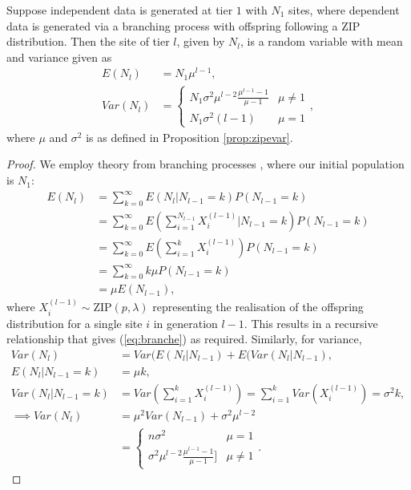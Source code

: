 \begin{proposition}
\label{prop:zipgeneration}
    Suppose independent data is generated at tier $1$ with $N_1$ sites, where dependent data is generated via a branching process with offspring following a ZIP distribution. Then the site of tier $l$, given by $N_l$, is a random variable with mean and variance given as 
    \begin{align}
        E(N_l) &= N_1 \mu^{l-1}, \label{eq:branche}\\
        Var(N_l) &= \begin{cases}
            N_1 \sigma^2 \mu^{l-2} \frac{\mu^{l-1}-1}{\mu-1} & \mu \neq 1\\
            N_1 \sigma^2 (l-1) & \mu = 1
        \end{cases} \label{eq:branchvar},
    \end{align}
    where $\mu$ and $\sigma^2$ is as defined in Proposition \ref{prop:zipevar}.
\end{proposition}
\begin{proof}
    We employ theory from branching processes \cite{Dubrow2016}, where our initial population is $N_1$:
    \begin{align}
        E(N_l) &= \sum_{k=0}^\infty E(N_l|N_{l-1} = k) P(N_{l-1}=k) \\
        &= \sum_{k=0}^\infty E\left(\sum_{i=1}^{N_{l-1}} X^{(l-1)}_{i} | N_{l-1} = k\right) P(N_{l-1}=k) \\
        &= \sum_{k=0}^\infty E\left(\sum_{i=1}^{k} X^{(l-1)}_{i}\right) P(N_{l-1}=k) \\
        &= \sum_{k=0}^\infty k\mu P(N_{l-1}=k) \\
        &= \mu E(N_{l-1}),
    \end{align}
    where $X^{(l-1)}_{i} \sim \text{ZIP}(p, \lambda)$ representing the realisation of the offspring distribution for a single site $i$ in generation $l-1$. This results in a recursive relationship that gives (\ref{eq:branche}) as required. Similarly, for variance,
    \begin{align}
        Var(N_l) &= Var(E(N_l | N_{l-1}) + E(Var(N_l|N_{l-1}), \\
        E(N_l|N_{l-1} = k) &= \mu k, \\
        Var(N_l|N_{l-1} = k) &= Var\left(\sum_{i=1}^k X^{(l-1)}_{i}\right) = \sum_{i=1}^k Var\left(X^{(l-1)}_{i}\right) = \sigma^2 k, \\
        \implies Var(N_l) &=\mu^2 Var(N_{l-1}) + \sigma^2\mu^{l-2} \\
        &= \begin{cases}
            n\sigma^2 & \mu = 1\\
            \sigma^2 \mu^{l-2}\frac{\mu^{l-1} - 1}{\mu - 1}]& \mu \neq1 
        \end{cases}.
    \end{align}
\end{proof}

